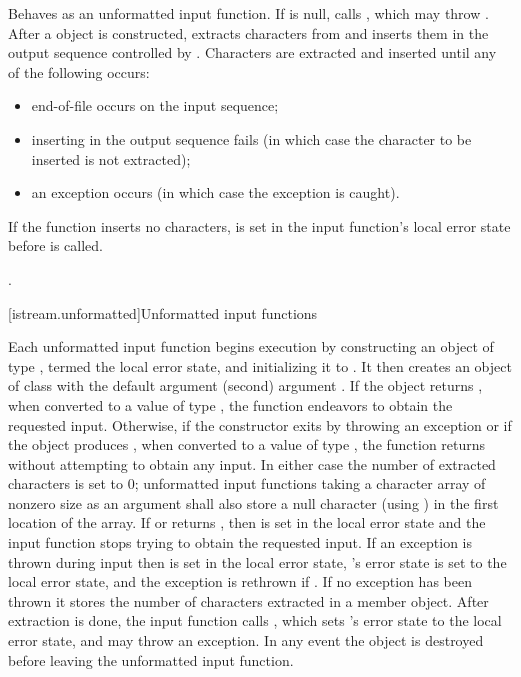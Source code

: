 \begin{itemdescr}
\pnum
\effects
Behaves as an unformatted input function.
If  is null, calls
,
which may throw
.
After a  object is constructed, extracts
characters from
and inserts them in the output sequence controlled by .
Characters are extracted and inserted until any of the following occurs:
\begin{itemize}
\item
end-of-file occurs on the input sequence;
\item
inserting in the output sequence fails
(in which case the character to be inserted is not extracted);
\item
an exception occurs (in which case the exception is caught).
\end{itemize}

\pnum
If the function inserts no characters,
 is set in the input function's local error state
before  is called.

\pnum
\returns
{}.
\end{itemdescr}

[istream.unformatted]{Unformatted input functions}

\pnum
Each unformatted input function begins execution by constructing
an object of type , termed the local error state, and
initializing it to .
It then creates an object of class
with the default argument
(second) argument
.
If the
object returns
,
when converted to a value of type
,
the function endeavors
to obtain the requested input.
Otherwise, if the  constructor exits by throwing an exception or if
the  object produces , when converted to a value of type
,
the function returns without attempting to obtain any input.
In either case the number of extracted characters is set to 0;
unformatted input functions taking a character array of nonzero size as
an argument shall also store a null character (using
)
in the first location of the array.
If  or 
returns , then
 is set in the local error state and
the input function stops trying to obtain the requested input.
If an exception is thrown during input then
 is set in the local error state,
's error state is set to the local error state, and
the exception is rethrown if .
If no exception has been thrown it
stores the number of characters extracted
in a member object.
After extraction is done, the input function calls , which
sets 's error state to the local error state, and
may throw an exception.
In any event the
object
is destroyed before leaving the unformatted input function.

